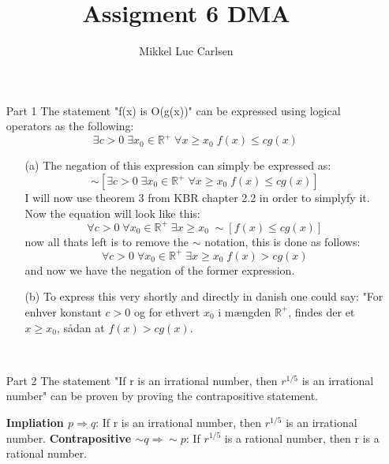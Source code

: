 \documentclass[12pt,a4paper]{article}
\title{Assigment 6 DMA}
\author{Mikkel Luc Carlsen}
\theoremstyle{plain}
\theoremstyle{definition}
\newcommand{\RR}{\mathbb{R}}
\begin{document}
\maketitle

\begin{itemize}
    \item[Part 1] 
    The statement "f(x) is O(g(x))" can be expressed using logical operators as the following:
    \begin{equation}
        \exists c>0 \; \exists x_0\in \RR^+ \; \forall x\ge x_0 \; f(x) \le cg(x)
    \end{equation}
    \begin{enumerate}
    \item[(a)]
    The negation of this expression can simply be expressed as:
    \begin{equation}
        \sim [\exists c>0 \; \exists x_0\in \RR^+ \; \forall x\ge x_0 \; f(x) \le cg(x)]
    \end{equation}  
    I will now use theorem 3 from KBR chapter 2.2 in order to simplyfy it. Now the equation will look like this:
    \begin{equation}
        \forall c>0 \; \forall x_0\in \RR^+ \; \exists x\ge x_0 \; \sim[f(x) \le cg(x)]
    \end{equation}
    now all thats left is to remove the $\sim$ notation, this is done as follows:
    \begin{equation}
        \forall c>0 \; \forall x_0\in \RR^+ \; \exists x\ge x_0 \; f(x) > cg(x)
    \end{equation}
    and now we have the negation of the former expression.

    \item[(b)]
    To express this very shortly and directly in danish one could say: "For enhver konstant $c>0$ og for ethvert $x_0$ i mængden $\RR^+$, 
    findes der et $x\ge x_0$, sådan at $f(x) > cg(x)$.
\end{enumerate}\

\item[Part 2]
    The statement "If r is an irrational number, then $r^{1/5}$ is an irrational number" can be proven by proving the contrapositive statement. 

    \textbf{Impliation $p\Rightarrow q$}: If r is an irrational number, then $r^{1/5}$ is an irrational number.
    \newline \textbf{Contrapositive $\sim q \Rightarrow \sim p$}: If $r^{1/5}$ is a rational number, then r is a rational number.


\end{itemize}
\end{document}
